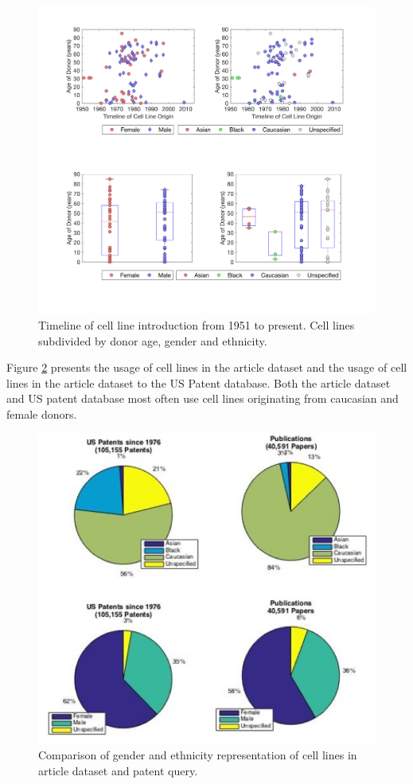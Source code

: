 \documentclass[10pt]{article}
\begin{document}
\begin{figure}[h!]
\centering
\includegraphics[trim={20cm 20cm 20cm 20cm}, width=0.98\columnwidth]{Figures/ScatterAge_2}
\caption{\label{sc1}Timeline of cell line introduction from 1951 to present. Cell lines subdivided by donor age, gender and ethnicity.}
\end{figure}

\newpage

Figure \ref {pc1} presents the usage of cell lines in the article dataset and the usage of cell lines in the article dataset to the US Patent database. Both the article dataset and US patent database most often use cell lines originating from caucasian and female donors.  

\begin{figure}[h!]
\centering
\includegraphics[width=0.79\columnwidth]{Figures/PieChart_1}
\caption{\label{pc1} Comparison of gender and ethnicity representation of cell lines in article dataset and patent query.}
\end{figure}
\end{document}
